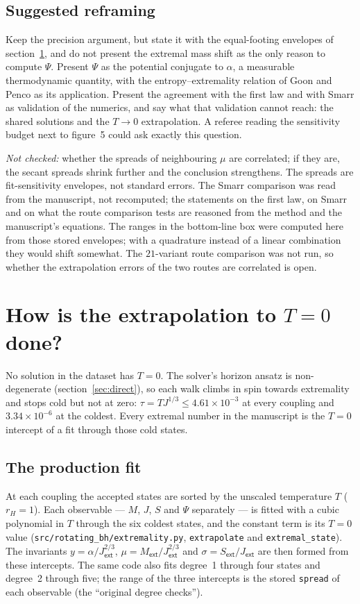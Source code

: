 \documentclass[11pt,a4paper]{article}
\newcommand{\q}[1]{\subsection*{\color{accent}#1}}
\newcommand{\ext}{\mathsf{ext}}
\begin{document}
\q{Suggested reframing}

Keep the precision argument, but state it with the equal-footing envelopes
of section~\ref{sec:extrap}, and do not present the extremal mass shift as the
only reason to compute $\Psi$. Present $\Psi$
as the potential conjugate to $\alpha$, a measurable thermodynamic quantity,
with the entropy--extremality relation of Goon and Penco as its application.
Present the agreement with the first law and with Smarr as validation of the
numerics, and say what that validation cannot reach: the shared solutions and
the $T\to0$ extrapolation. A referee reading the sensitivity budget next to
figure~5 could ask exactly this question.

\medskip
\noindent\emph{Not checked:} whether the spreads of neighbouring $\mu$ are
correlated; if they are, the secant spreads shrink further and the conclusion
strengthens. The spreads are fit-sensitivity envelopes, not standard errors.
The Smarr comparison was read from the manuscript, not recomputed; the
statements on the first law, on Smarr and on what the route comparison tests are
reasoned from the method and the manuscript's equations. The ranges in the bottom-line box were computed here from those stored
envelopes; with a quadrature instead of a linear combination they would shift
somewhat. The $21$-variant route
comparison was not run, so whether the extrapolation errors of the two routes
are correlated is open.

\section{How is the extrapolation to $T=0$ done?}
\label{sec:extrap}

\noindent No solution in the dataset has $T=0$. The solver's horizon ansatz is
non-degenerate (section~\ref{sec:direct}), so each walk climbs in spin towards
extremality and stops cold but not at zero: $\tau=TJ^{1/3}\le4.61\times10^{-3}$
at every coupling and $3.34\times10^{-6}$ at the coldest. Every extremal number
in the manuscript is the $T=0$ intercept of a fit through those cold states.

\q{The production fit}

At each coupling the accepted states are sorted by the unscaled temperature $T$
($r_H=1$). Each observable --- $M$, $J$, $S$ and $\Psi$ separately --- is fitted
with a cubic polynomial in $T$ through the six coldest states, and the constant
term is its $T=0$ value (\texttt{src/rotating\_bh/extremality.py},
\texttt{extrapolate} and \texttt{extremal\_state}). The invariants
$y=\alpha/J_\ext^{2/3}$, $\mu=M_\ext/J_\ext^{2/3}$ and $\sigma=S_\ext/J_\ext$ are
then formed from these intercepts. The same code also fits degree~1 through
four states and degree~2 through five; the range of the three intercepts is the
stored \texttt{spread} of each observable (the ``original degree checks'').
\end{document}
